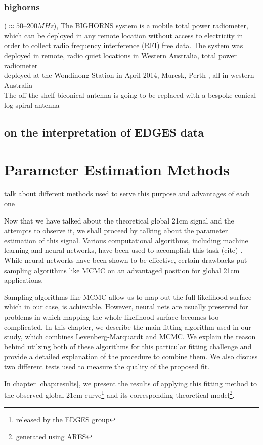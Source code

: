 \documentclass[12pt, TexShade, letterpaper]{report}
\begin{document}
\subsection{\gls{bighorns}}
($\approx 50–200 MHz$), The BIGHORNS system is a mobile total power radiometer, which can be deployed in any remote location without access to electricity in order to collect radio frequency interference (RFI) free data. The system was deployed in remote, radio quiet locations in Western Australia, total power radiometer \\
deployed at the Wondinong Station in April 2014, Muresk, Perth , all in western Australia \\
The off-the-shelf biconical antenna is going to be replaced with a bespoke conical log spiral antenna \cite{bighorns_1}
\section{on the interpretation of EDGES data}
\cite{saras_curse_edges}
\chapter{Parameter Estimation Methods}
\label{chap:method}
talk about different methods used to serve this purpose and advantages of each one\par
Now that we have talked about the theoretical global 21cm signal and the attempts to observe it, we shall proceed by talking about the parameter estimation of this signal. Various computational algorithms, including machine learning and neural networks, have been used to accomplish this task (cite) . While neural networks have been shown to be effective, certain drawbacks  put sampling algorithms like MCMC on an advantaged position for global 21cm applications.\par
Sampling algorithms like MCMC allow us to map out the full likelihood surface which in our case, is achievable. However, neural nets are usually preserved for problems in which mapping the whole likelihood surface  becomes too complicated.
In this chapter, we describe the main fitting algorithm used in our study, which combines Levenberg-Marquardt and MCMC. We explain the reason behind utilzing both of these algorithms for this particular fitting challenge and provide a detailed explanation of the procedure to combine them. We also discuss two different tests used to measure the quality of the proposed fit.\par
In chapter \ref{chap:results}, we present the results of applying this fitting method to the observed global 21cm curve\footnote{released by the EDGES group} and its corresponding theoretical model\footnote{generated using ARES}.
\end{document}
